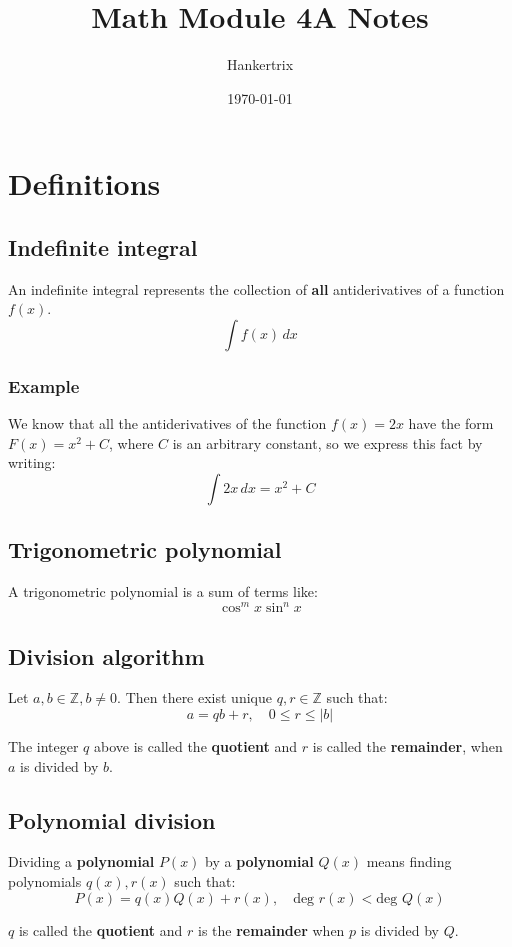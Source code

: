 \documentclass[11pt]{article}
\author{Hankertrix}
\date{\today}
\title{Math Module 4A Notes}
\begin{document}
\maketitle
\setcounter{tocdepth}{2}
\tableofcontents \clearpage\section{Definitions}
\label{sec:org28eab79}

\subsection{Indefinite integral}
\label{sec:orge740ebf}
An indefinite integral represents the collection of \textbf{all} antiderivatives of a function \(f(x)\).
\[\int f(x) \, dx\]
\subsubsection{Example}
\label{sec:org644b2dc}
We know that all the antiderivatives of the function \(f(x) = 2x\) have the form \(F(x) = x^2 + C\), where \(C\) is an arbitrary constant, so we express this fact by writing:
\[\int 2x \, dx = x^2 + C\]
\subsection{Trigonometric polynomial}
\label{sec:orgad53544}
A trigonometric polynomial is a sum of terms like:
\[\cos^m x \sin^n x\]
\subsection{Division algorithm}
\label{sec:org5b7d95a}
Let \(a, b \in \mathbb{Z}, b \ne 0\). Then there exist unique \(q, r \in \mathbb{Z}\) such that:
\[a = qb + r, \quad 0 \le r \le |b|\]

The integer \(q\) above is called the \textbf{quotient} and \(r\) is called the \textbf{remainder}, when \(a\) is divided by \(b\).
\subsection{Polynomial division}
\label{sec:org9a7fc67}
Dividing a \textbf{polynomial} \(P(x)\) by a \textbf{polynomial} \(Q(x)\) means finding polynomials \(q(x), r(x)\) such that:
\[P(x) = q(x) Q(x) + r(x), \quad \text{deg } r(x) < \text{deg } Q(x)\]

\(q\) is called the \textbf{quotient} and \(r\) is the \textbf{remainder} when \(p\) is divided by \(Q\).
\end{document}
